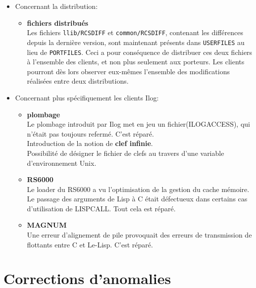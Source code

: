 \begin {itemize}
\begin{itemize}
\item Le fichier {\tt C/Machine.h} de chaque portage s'est vu
l\'{e}g\`{e}rement modifi\'{e}, suite \`{a} l'introduction de nouvelles macros
(LLGETCWD,LLBMEMALIGN).
\end{itemize}

\item Concernant la distribution:
\begin{itemize}
\item {\bf fichiers distribu\'{e}s}\\
Les fichiers {\tt llib/RCSDIFF} et {\tt common/RCSDIFF}, contenant les
diff\'{e}rences depuis la derni\`{e}re version, sont
maintenant pr\'{e}sents dans {\tt USERFILES} au lieu de {\tt PORTFILES}.
Ceci a pour cons\'{e}quence de distribuer ces deux fichiers \`{a} l'ensemble
des clients, et non plus seulement aux porteurs. Les clients pourront
d\`{e}s lors observer eux-m\^{e}mes l'ensemble des modifications r\'{e}alis\'{e}es
entre deux distributions.
\end {itemize}

\item Concernant plus sp\'{e}cifiquement les clients Ilog:
\begin{itemize}
\item {\bf plombage}\\
Le plombage introduit par Ilog met en jeu un fichier(ILOGACCESS), 
qui n'\'{e}tait pas toujours referm\'{e}. C'est r\'{e}par\'{e}.\\
Introduction de la notion de {\bf clef infinie}. \\
Possibilit\'{e} de d\'{e}signer le fichier de clefs au travers d'une
variable d'environnement Unix. 

\item {\bf RS6000}\\
Le loader du RS6000 a vu l'optimisation de la gestion du cache
m\'{e}moire. Le passage des arguments de Lisp \`{a} C \'{e}tait d\'{e}fectueux
dans certains cas d'utilisation de LISPCALL. Tout cela est r\'{e}par\'{e}.

\item {\bf MAGNUM}\\
Une erreur d'alignement de pile provoquait des erreurs de
transmission de flottants entre C et Le-Lisp. C'est r\'{e}par\'{e}.

\end {itemize}
\end{itemize}

\chapter{Corrections d'anomalies}

